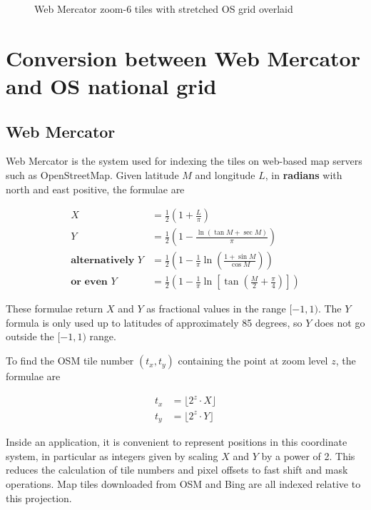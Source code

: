 \documentclass[10pt,a4paper]{article}
\begin{document}
\begin{figure}[t]
  \centering
  \fbox{
    
  }
  \caption{Web Mercator zoom-6 tiles with stretched OS grid overlaid}
  \label{fig:grid_os}
\end{figure}

\section {Conversion between Web Mercator and OS national grid}

\subsection {Web Mercator}
Web Mercator is the system used for indexing the tiles on web-based map servers
such as OpenStreetMap.  Given latitude $M$ and longitude $L$, in
\textbf{radians} with north and east positive, the formulae are 

\begin{align}
  X & = \frac{1}{2}\left(1 + \frac{L}{\pi} \right) \label{eqn:wmx} \\
  Y & = \frac{1}{2}\left(1 - \frac{
       \ln\left(\tan{M} + \sec{M}\right)
     }{\pi} \right) \label{eqn:wmy} \\
    \textbf{alternatively } Y & = \frac{1}{2} \left(
        1 - \frac{1}{\pi} \ln \left(
          \frac{1 + \sin{M}}{\cos{M}}
        \right)
        \right) \\
    \textbf{or even } Y & = \frac{1}{2} \left(
        1 - \frac{1}{\pi} \ln \left[
          \tan\left(\frac{M}{2} + \frac{\pi}{4}\right)
        \right]
        \right)
\end{align}

These formulae return $X$ and $Y$ as fractional values in the range $[-1,1)$.
The $Y$ formula is only used up to latitudes of approximately 85 degrees, so
$Y$ does not go outside the $[-1,1)$ range.

To find the OSM tile number $(t_x,t_y)$ containing the point at zoom level $z$,
the formulae are

\begin{align}
  t_x &= \lfloor 2^z \cdot X \rfloor \\
  t_y &= \lfloor 2^z \cdot Y \rfloor
\end{align}

Inside an application, it is convenient to represent positions in this
coordinate system, in particular as integers given by scaling $X$ and $Y$ by a
power of 2.  This reduces the calculation of tile numbers and pixel offsets to
fast shift and mask operations.  Map tiles downloaded from OSM and Bing are all
indexed relative to this projection.
\end{document}
